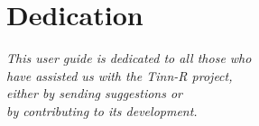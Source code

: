 
\chapter*{Dedication}


\thispagestyle{empty}


\begin{flushright}
  {\itshape This user guide is dedicated to all those who \\
    have assisted us with the Tinn-R project, \\
    either by sending suggestions or \\
    by contributing to its development.}
\end{flushright}
